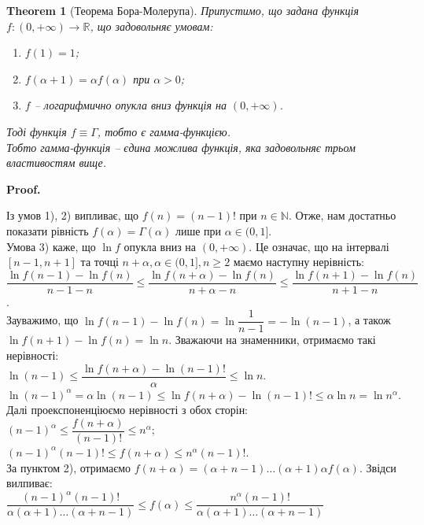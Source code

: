 \documentclass[a4paper, 10pt]{article}
\makeatletter
\def\qed{$\blacksquare$}
\theoremstyle{theoremdd}
\newtheorem{theorem}{Theorem}[subsection]
\theoremstyle{theoremdd}
\theoremstyle{theoremdd}
\theoremstyle{theoremdd}
\theoremstyle{theoremdd}
\theoremstyle{theoremdd}
\theoremstyle{theoremdd}
\theoremstyle{theoremdd}
\theoremstyle{theoremdd}
\renewenvironment{proof}[1][Proof.\\]{\par
\pushQED{\hfill \qed}%
\normalfont \topsep6\p@\@plus6\p@\relax
\trivlist
\item\relax
{\bfseries
#1\@addpunct{.}}\hspace\labelsep\ignorespaces
}{%
\popQED\endtrivlist\@endpefalse
}
\makeatother
\begin{document}
\begin{theorem}[Теорема Бора-Молерупа]
Припустимо, що задана функція $f \colon (0,+\infty) \to \mathbb{R}$, що задовольняє умовам:
\begin{enumerate}[nosep,wide=0pt,label={\arabic*)}]
\item $f(1) = 1$;
\item $f(\alpha+1) = \alpha f(\alpha)$ при $\alpha > 0$;
\item $f$ -- логарифмично опукла вниз функція на $(0,+\infty)$.
\end{enumerate}
Тоді функція $f \equiv \Gamma$, тобто є гамма-функцією.\\
Тобто гамма-функція -- єдина можлива функція, яка задовольняє трьом властивостям вище.
\end{theorem}

\begin{proof}
Із умов 1), 2) випливає, що $f(n) = (n-1)!$ при $n \in \mathbb{N}$. Отже, нам достатньо показати рівність $f(\alpha) = \Gamma(\alpha)$ лише при $\alpha \in (0,1]$.\\
Умова 3) каже, що $\ln f$ опукла вниз на $(0,+\infty)$. Це означає, що на інтервалі $[n-1,n+1]$ та точці $n+\alpha, \alpha \in (0,1], n \geq 2$ маємо наступну нерівність:\\
$\dfrac{\ln f(n-1) - \ln f(n)}{n-1-n} \leq \dfrac{\ln f(n+\alpha) - \ln f(n)}{n+\alpha - n} \leq \dfrac{\ln f(n+1) - \ln f(n)}{n+1-n}$.\\
Зауважимо, що $\ln f(n-1) - \ln f(n) = \ln \dfrac{1}{n-1} = -\ln (n-1)$, а також $\ln f(n+1) - \ln f(n) = \ln n$. Зважаючи на знаменники, отримаємо такі нерівності:\\
$\ln (n-1) \leq \dfrac{\ln f(n+\alpha) - \ln (n-1)!}{\alpha} \leq \ln n$.\\
$\ln (n-1)^\alpha = \alpha \ln (n-1) \leq \ln f(n+\alpha) - \ln (n-1)! \leq \alpha \ln n = \ln n^\alpha$.\\
Далі проекспоненціюємо нерівності з обох сторін:\\
$(n-1)^\alpha \leq \dfrac{f(n+\alpha)}{(n-1)!} \leq n^\alpha$;\\
$(n-1)^\alpha (n-1)! \leq f(n+\alpha) \leq n^\alpha (n-1)!$.\\
За пунктом 2), отримаємо $f(n+\alpha) = (\alpha + n-1) \dots (\alpha+1)\alpha f(\alpha)$. Звідси вилпиває:\\
$\dfrac{(n-1)^\alpha (n-1)!}{\alpha (\alpha+1) \dots (\alpha+n-1)} \leq f(\alpha) \leq \dfrac{n^\alpha (n-1)!}{\alpha (\alpha+1) \dots (\alpha+n-1)}$\\

\end{proof}
\end{document}
